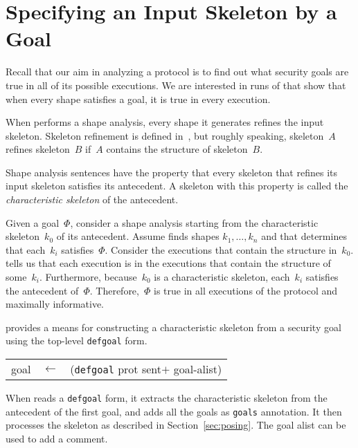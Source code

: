 \documentclass[12pt]{article}
\newcommand{\sym}[1]{\textup{\texttt{#1}}}
\begin{document}
\section{Specifying an Input Skeleton by a Goal}\label{sec:specifying}

Recall that our aim in analyzing a protocol is to find out what
security goals are true in all of its possible executions.  We are
interested in runs of {\cpsa} that show that when every shape
satisfies a goal, it is true in every execution.

When {\cpsa} performs a shape analysis, every shape it generates
refines the input skeleton.  Skeleton refinement is defined
in~\cite[Section~6]{cpsaprimer09}, but roughly speaking, skeleton~$A$
refines skeleton~$B$ if~$A$ contains the structure of skeleton~$B$.
  
Shape analysis sentences have the property that every skeleton that
refines its input skeleton satisfies its antecedent.  A skeleton with
this property is called the \emph{characteristic skeleton} of the
antecedent.

Given a goal~\(\Phi\), consider a shape analysis starting from the
characteristic skeleton~$k_0$ of its antecedent.  Assume {\cpsa} finds
shapes $k_1,\ldots,k_n$ and that {\cpsa} determines that each~$k_i$
satisfies~$\Phi$.  Consider the executions that contain the structure
in~$k_0$.  {\cpsa} tells us that each execution is in the executions
that contain the structure of some~$k_i$.  Furthermore, because~$k_0$
is a characteristic skeleton, each~$k_i$ satisfies the antecedent
of~$\Phi$.  Therefore,~$\Phi$ is true in all executions of the
protocol and maximally informative.

{\cpsa} provides a means for constructing a characteristic skeleton
from a security goal using the top-level \texttt{defgoal} form.

\begin{center}\scshape
  \begin{tabular}{rcl}
  goal&$\leftarrow$&(\sym{defgoal} prot sent$+$ goal-alist)
  \end{tabular}
\end{center}

When {\cpsa} reads a \texttt{defgoal} form, it extracts the
characteristic skeleton from the antecedent of the first goal, and
adds all the goals as \texttt{goals} annotation.  It then processes
the skeleton as described in Section~\ref{sec:posing}.  The goal alist
can be used to add a comment.
\end{document}
